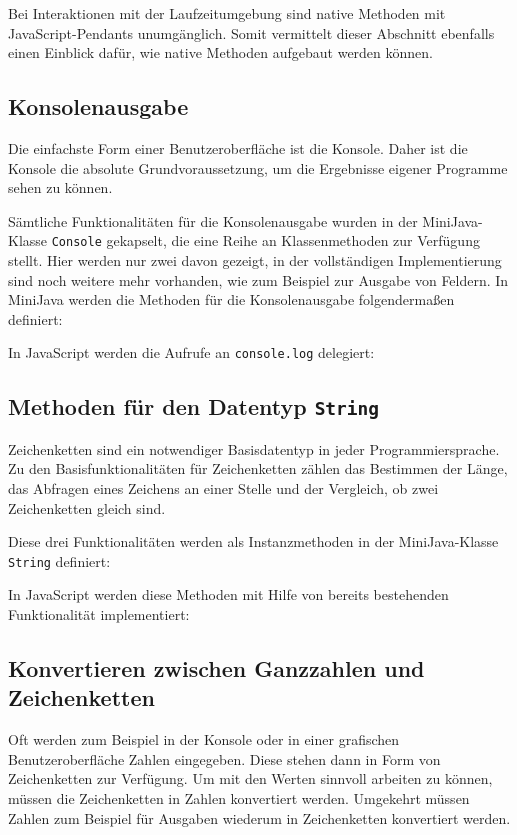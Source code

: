 Bei Interaktionen mit der Laufzeitumgebung sind native Methoden mit JavaScript-Pendants unumgänglich. Somit vermittelt dieser Abschnitt ebenfalls einen Einblick dafür, wie native Methoden aufgebaut werden können.

\subsection{Konsolenausgabe}
Die einfachste Form einer Benutzeroberfläche ist die Konsole. Daher ist die Konsole die absolute Grundvoraussetzung, um die Ergebnisse eigener Programme sehen zu können.

Sämtliche Funktionalitäten für die Konsolenausgabe wurden in der MiniJava-Klasse \lstinline{Console} gekapselt, die eine Reihe an Klassenmethoden zur Verfügung stellt. Hier werden nur zwei davon gezeigt, in der vollständigen Implementierung sind noch weitere mehr vorhanden, wie zum Beispiel zur Ausgabe von Feldern. In MiniJava werden die Methoden für die Konsolenausgabe folgendermaßen definiert:


In JavaScript werden die Aufrufe an \lstinline{console.log} delegiert:


\subsection{Methoden für den Datentyp \lstinline{String}}

Zeichenketten sind ein notwendiger Basisdatentyp in jeder Programmiersprache. Zu den Basisfunktionalitäten für Zeichenketten zählen das Bestimmen der Länge, das Abfragen eines Zeichens an einer Stelle und der Vergleich, ob zwei Zeichenketten gleich sind.

Diese drei Funktionalitäten werden als Instanzmethoden in der MiniJava-Klasse \lstinline{String} definiert:


In JavaScript werden diese Methoden mit Hilfe von bereits bestehenden Funktionalität implementiert:


\subsection{Konvertieren zwischen Ganzzahlen und Zeichenketten}

Oft werden zum Beispiel in der Konsole oder in einer grafischen Benutzeroberfläche Zahlen eingegeben. Diese stehen dann in Form von Zeichenketten zur Verfügung. Um mit den Werten sinnvoll arbeiten zu können, müssen die Zeichenketten in Zahlen konvertiert werden. Umgekehrt müssen Zahlen zum Beispiel für Ausgaben wiederum in Zeichenketten konvertiert werden.

